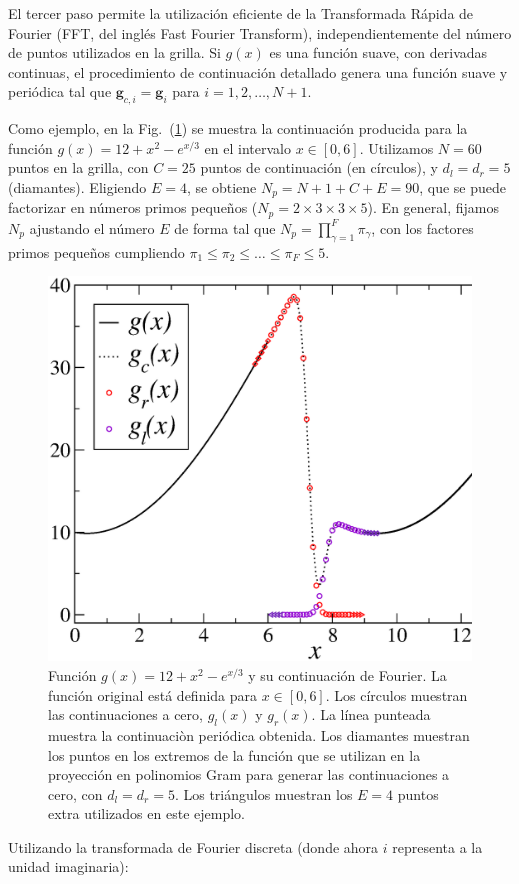 El tercer paso permite la utilización eficiente de la Transformada Rápida de Fourier
(FFT, del inglés Fast Fourier Transform), independientemente del número de puntos 
utilizados en la grilla.  
Si $g(x)$ es una función suave, con derivadas continuas, el 
procedimiento de continuación detallado genera una función suave 
y periódica tal que $\mathbf{g}_{c,i}=\mathbf{g}_i$ para $i=1,2,\ldots,N+1$.

Como ejemplo, en la Fig.~(\ref{fig:Continuedg}) se muestra la continuación 
producida para la función $g(x)=12+x^2 - e^{x/3}$ en el intervalo $x\in [0,6]$.
Utilizamos $N=60$ puntos en la grilla, con $C=25$ puntos de continuación (en círculos), 
y $d_l=d_r=5$ (diamantes). Eligiendo $E=4$, se obtiene  $N_p = N + 1 + C + E=90$, 
que se puede factorizar en números primos pequeños ($N_p=2\times 3 \times 3 \times 5$). 
En general, fijamos $N_p$ ajustando el número $E$ de forma tal 
que $N_p=\prod_{\gamma=1}^{F} \pi_{\gamma}$, con los factores 
primos pequeños cumpliendo $\pi_1\leq\pi_2\leq \ldots \leq \pi_{F} \leq 5$. 

\begin{figure}[h!]
\centering
  \includegraphics[width=0.5\linewidth]{figuras/continued.eps}
  \caption{Función $g(x)=12+x^2 - e^{x/3}$ y su continuación de Fourier. 
  La función original está definida para $x\in[0,6]$. Los círculos muestran las continuaciones a cero, $g_l(x)$ y $g_r(x)$.
  La línea punteada muestra la continuaciòn periódica obtenida. 
  Los diamantes muestran los puntos en los extremos de la función 
  que se utilizan en la proyección en polinomios Gram para generar las continuaciones 
  a cero, con $d_l=d_r=5$. Los triángulos muestran los $E=4$ puntos 
  extra utilizados en este ejemplo.}
 \label{fig:Continuedg}
\end{figure}

Utilizando la transformada de Fourier discreta (donde ahora $i$ representa a la unidad imaginaria):

